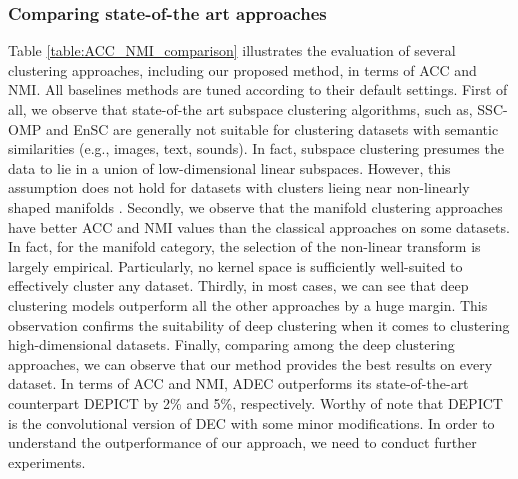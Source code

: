 \documentclass{article}
\begin{document}
\subsubsection{Comparing state-of-the art approaches}

Table \ref{table:ACC_NMI_comparison} illustrates the evaluation of several clustering approaches, including our proposed method, in terms of ACC and NMI. All baselines methods are tuned according to their default settings. First of all, we observe that state-of-the art subspace clustering algorithms, such as, SSC-OMP and EnSC are generally not suitable for clustering datasets with semantic similarities (e.g., images, text, sounds). In fact, subspace clustering presumes the data to lie in a union of low-dimensional linear subspaces. However, this assumption does not hold for datasets with clusters lieing near non-linearly shaped manifolds \cite{paper81}. Secondly, we observe that the manifold clustering approaches have better ACC and NMI values than the classical approaches on some datasets. In fact, for the manifold category, the selection of the non-linear transform is largely empirical. Particularly, no kernel space is sufficiently well-suited to effectively cluster any dataset. Thirdly, in most cases, we can see that deep clustering  models outperform all the other approaches by a huge margin. This observation confirms the suitability of deep clustering when it comes to clustering high-dimensional datasets. Finally, comparing among the deep clustering approaches, we can observe that our method provides the best results on every dataset. In terms of ACC and NMI, ADEC outperforms its state-of-the-art counterpart DEPICT by 2\% and 5\%, respectively. Worthy of note that DEPICT is the convolutional version of DEC with some minor modifications. In order to understand the outperformance of our approach, we need to conduct further experiments.
\end{document}
